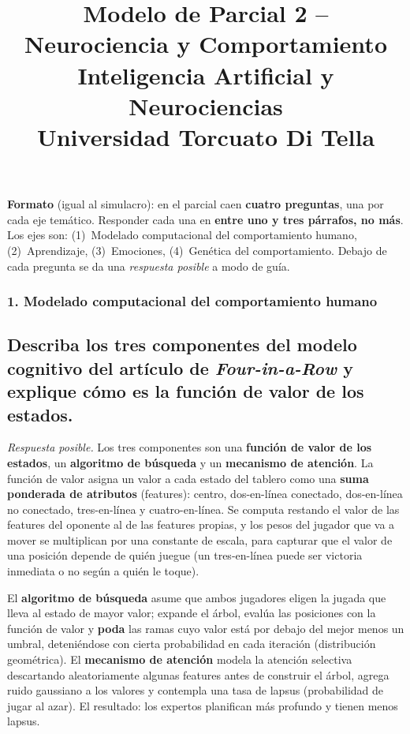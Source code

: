 \documentclass[11pt, a4paper]{article}
\title{\textbf{Modelo de Parcial 2 -- Neurociencia y Comportamiento} \\
\large Inteligencia Artificial y Neurociencias \\ Universidad Torcuato Di Tella}
\author{}
\date{}
\newcommand{\pregunta}[1]{\subsection{#1}}
\newcommand{\eje}[1]{\subsubsection{#1}}
\begin{document}
\maketitle

\begin{mdframed}[linecolor=black, linewidth=0.7pt]
\textbf{Formato} (igual al simulacro): en el parcial caen \textbf{cuatro preguntas}, una por cada eje tem\'atico. Responder cada una en \textbf{entre uno y tres p\'arrafos, no m\'as}. Los ejes son: (1)~Modelado computacional del comportamiento humano, (2)~Aprendizaje, (3)~Emociones, (4)~Gen\'etica del comportamiento. Debajo de cada pregunta se da una \emph{respuesta posible} a modo de gu\'ia.
\end{mdframed}

\eje{1. Modelado computacional del comportamiento humano}
\pregunta{Describa los tres componentes del modelo cognitivo del art\'iculo de \textit{Four-in-a-Row} y explique c\'omo es la funci\'on de valor de los estados.}

\begin{respuesta}
\textit{Respuesta posible.} Los tres componentes son una \textbf{funci\'on de valor de los estados}, un \textbf{algoritmo de b\'usqueda} y un \textbf{mecanismo de atenci\'on}. La funci\'on de valor asigna un valor a cada estado del tablero como una \textbf{suma ponderada de atributos} (features): centro, dos-en-l\'inea conectado, dos-en-l\'inea no conectado, tres-en-l\'inea y cuatro-en-l\'inea. Se computa restando el valor de las features del oponente al de las features propias, y los pesos del jugador que va a mover se multiplican por una constante de escala, para capturar que el valor de una posici\'on depende de qui\'en juegue (un tres-en-l\'inea puede ser victoria inmediata o no seg\'un a qui\'en le toque).

El \textbf{algoritmo de b\'usqueda} asume que ambos jugadores eligen la jugada que lleva al estado de mayor valor; expande el \'arbol, eval\'ua las posiciones con la funci\'on de valor y \textbf{poda} las ramas cuyo valor est\'a por debajo del mejor menos un umbral, deteni\'endose con cierta probabilidad en cada iteraci\'on (distribuci\'on geom\'etrica). El \textbf{mecanismo de atenci\'on} modela la atenci\'on selectiva descartando aleatoriamente algunas features antes de construir el \'arbol, agrega ruido gaussiano a los valores y contempla una tasa de lapsus (probabilidad de jugar al azar). El resultado: los expertos planifican m\'as profundo y tienen menos lapsus.
\end{respuesta}
\end{document}
